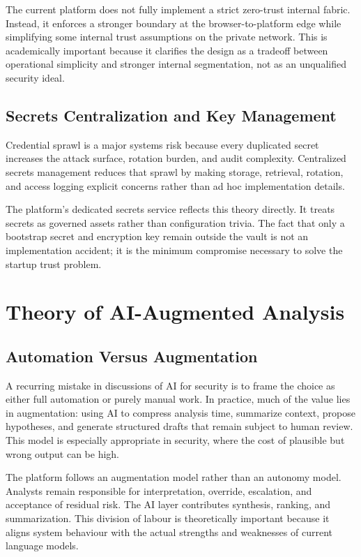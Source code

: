 The current platform does not fully implement a strict zero-trust internal fabric. Instead, it enforces a stronger boundary at the browser-to-platform edge while simplifying some internal trust assumptions on the private network. This is academically important because it clarifies the design as a tradeoff between operational simplicity and stronger internal segmentation, not as an unqualified security ideal.

\subsection{Secrets Centralization and Key Management}
Credential sprawl is a major systems risk because every duplicated secret increases the attack surface, rotation burden, and audit complexity. Centralized secrets management reduces that sprawl by making storage, retrieval, rotation, and access logging explicit concerns rather than ad hoc implementation details.

The platform's dedicated secrets service reflects this theory directly. It treats secrets as governed assets rather than configuration trivia. The fact that only a bootstrap secret and encryption key remain outside the vault is not an implementation accident; it is the minimum compromise necessary to solve the startup trust problem.

\section{Theory of AI-Augmented Analysis}
\subsection{Automation Versus Augmentation}
A recurring mistake in discussions of AI for security is to frame the choice as either full automation or purely manual work. In practice, much of the value lies in augmentation: using AI to compress analysis time, summarize context, propose hypotheses, and generate structured drafts that remain subject to human review. This model is especially appropriate in security, where the cost of plausible but wrong output can be high.

The platform follows an augmentation model rather than an autonomy model. Analysts remain responsible for interpretation, override, escalation, and acceptance of residual risk. The AI layer contributes synthesis, ranking, and summarization. This division of labour is theoretically important because it aligns system behaviour with the actual strengths and weaknesses of current language models.

